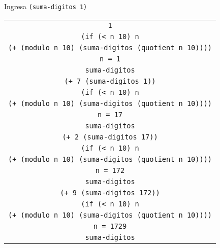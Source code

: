 \documentclass[letterpaper,11pt]{article}
\begin{document}
\begin{enumerate}
\begin{enumerate}
        Ingresa \texttt{(suma-digitos 1)}
        \begin{center}
            \begin{tabular}[h]{|c|}
                \hline
                \texttt{1} \\
                \texttt{(if (< n 10) n} \\
                \texttt{(+ (modulo n 10) (suma-digitos (quotient n 10))))} \\ 
                \texttt{n = 1} \\
                \texttt{suma-digitos} \\
                \hline
                \hline
                \texttt{(+ 7 (suma-digitos 1))} \\
                \texttt{(if (< n 10) n} \\
                \texttt{(+ (modulo n 10) (suma-digitos (quotient n 10))))} \\ 
                \texttt{n = 17} \\
                \texttt{suma-digitos} \\
                \hline
                \hline
                \texttt{(+ 2 (suma-digitos 17))} \\
                \texttt{(if (< n 10) n} \\
                \texttt{(+ (modulo n 10) (suma-digitos (quotient n 10))))} \\ 
                \texttt{n = 172} \\
                \texttt{suma-digitos} \\
                \hline
                \hline
                \texttt{(+ 9 (suma-digitos 172))} \\
                \texttt{(if (< n 10) n} \\
                \texttt{(+ (modulo n 10) (suma-digitos (quotient n 10))))} \\ 
                \texttt{n = 1729} \\
                \texttt{suma-digitos} \\
                \hline
            \end{tabular}
        \end{center}


\end{enumerate}
\end{enumerate}
\end{document}
